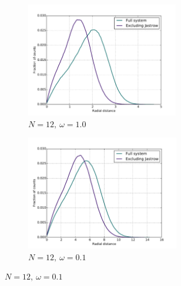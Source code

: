 \documentclass[english, a4paper]{article}
\begin{document}
\begin{figure}[H]
	\vspace{1mm}
	
	\begin{subfigure}{0.5\textwidth}
		\includegraphics[width=\textwidth, height=5cm]{figures/radialDistribution/radialDistributionN12w100Se7.pdf}
		\caption{$N=12,\:\omega=1.0$}
	\end{subfigure}
	\begin{subfigure}{0.5\textwidth}
		\includegraphics[width=\textwidth, height= 5cm]{figures/radialDistribution/radialDistributionN12w10Se7.pdf}
		\caption{$N=12,\:\omega=0.1$}
	\end{subfigure}
	
	\vspace{1mm}
	

\end{figure}
\end{document}
